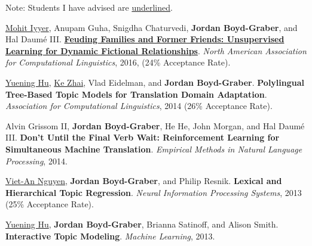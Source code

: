 \documentclass[10pt,a4paper]{article} %
\begin{document}
\spacedhrule{0.5em}{-0.4em} %



\inlineheadsection %
{Note:}
{Students I have advised are \underline{underlined}.}

\begin{multicols}{2}  %

\small

\begin{enumerate*}

\item \underline{Mohit Iyyer}, Anupam Guha, Snigdha Chaturvedi, {\bf Jordan Boyd-Graber}, and Hal {Daum\'{e} III}.  {\bf \href{http://cs.colorado.edu/~jbg//docs/2016_naacl_relationships.pdf}{Feuding Families and Former Friends: Unsupervised Learning for Dynamic Fictional Relationships}}.  \emph{North American Association for Computational Linguistics}, 2016, (24\% Acceptance Rate).

\item \underline{Yuening Hu}, \underline{Ke Zhai}, Vlad Eidelman, and {\bf Jordan Boyd-Graber}.  {\bf Polylingual Tree-Based Topic Models for Translation Domain Adaptation}.  \emph{Association for Computational Linguistics}, 2014 (26\% Acceptance Rate).

\item Alvin {Grissom II}, {\bf Jordan Boyd-Graber}, He He, John Morgan, and Hal {Daum\'{e} III}.  {\bf Don't Until the Final Verb Wait: Reinforcement Learning for Simultaneous Machine Translation}.  \emph{Empirical Methods in Natural Language Processing}, 2014.

\item \underline{Viet-An Nguyen}, {\bf Jordan Boyd-Graber}, and Philip
Resnik.  {\bf Lexical and Hierarchical Topic Regression}.
\emph{Neural Information Processing Systems}, 2013 (25\% Acceptance
Rate).

\item \underline{Yuening Hu}, {\bf Jordan Boyd-Graber}, Brianna
  Satinoff, and Alison Smith.  {\bf Interactive Topic Modeling}.
  \emph{Machine Learning}, 2013.


\end{enumerate*}
\end{multicols}
\end{document}
